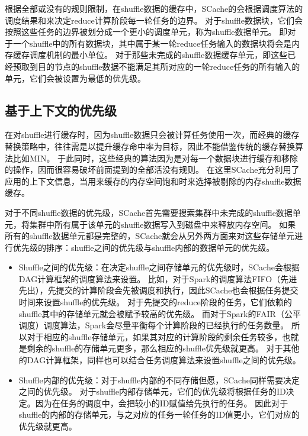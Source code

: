 根据全部或没有的规则限制，在shuffle数据的缓存中，SCache的会根据调度算法的调度结果和来决定reduce计算阶段每一轮任务的边界。
对于shuffle数据块，它们会按照这些任务的边界被划分成一个更小的调度单元，称为shuffle数据单元。
即对于一个shuffle中的所有数据块，其中属于某一轮reduce任务输入的数据块将会是内存缓存调度机制的最小单位。
对于那些未完成的shuffle数据缓存单元，即这些已经预取到目的节点的shuffle数据不能满足其所对应的一轮reduce任务的所有输入的单元，它们会被设置为最低的优先级。


\subsection{基于上下文的优先级}

在对shuffle进行缓存时，因为shuffle数据只会被计算任务使用一次，而经典的缓存替换策略中，往往需是以提升缓存命中率为目标，因此不能借鉴传统的缓存替换算法比如MIN\cite{min}。
于此同时，这些经典的算法因为是对每一个数据块进行缓存和移除的操作，因而很容易破坏前面提到的全部活没有规则。
在这里SCache充分利用了应用的上下文信息，当用来缓存的内存空间饱和时来选择被剔除的内存shuffle数据缓存。

对于不同shuffle数据的优先级，SCache首先需要搜索集群中未完成的shuffle数据单元，将集群中所有属于该单元的shuffle数据写入到磁盘中来释放内存空间。
如果所有的shuffle数据单元都是完整的，SCache就会从另外两方面来对这些存储单元进行优先级的排序：shuffle之间的优先级与shuffle内部的数据单元的优先级。

\begin{itemize}
	\item Shuffle之间的优先级：在决定shuffle之间存储单元的优先级时，SCache会根据DAG计算框架的调度算法来设置。
	比如，对于Spark的调度算法FIFO（先进先出），先提交的计算阶段会先被调度和执行，因此SCache也会根据任务提交时间来设置shuffle的优先级。
	对于先提交的reduce阶段的任务，它们依赖的shuffle其中的存储单元就会被赋予较高的优先级。
	而对于Spark的FAIR（公平调度）调度算法，Spark会尽量平衡每个计算阶段的已经执行的任务数量。
	所以对于相应的shuffle存储单元，如果其对应的计算阶段的剩余任务较多，也就是剩余的shuffle的存储单元更多，那么相应的shuffle优先级就更高。
	对于其他的DAG计算框架，同样也可以结合任务调度算法来设置shuffle之间的优先级。
	\item Shuffle内部的优先级：对于shuffle内部的不同存储但愿，SCache同样需要决定之间的优先级。
	对于shuffle内部存储单元，它们的优先级将根据任务的ID决定。因为在任务的调度中，会把较小的ID赋值给先执行的任务。
	因此对于shuffle的内部的存储单元，与之对应的任务一轮任务的ID值更小，它们对应的优先级就更高。
\end{itemize}




